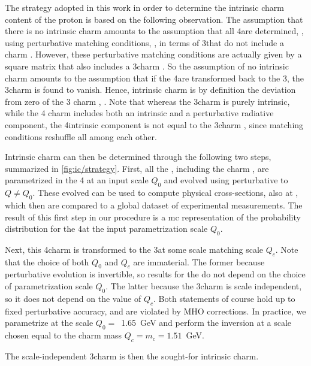 
The strategy adopted in this work in order to determine the intrinsic charm
content of the proton is  based on the following observation.
%
The assumption that there is no intrinsic charm amounts to the assumption that
all 4\fns \pdfs are determined, \cite{Collins:1986mp}, using perturbative
matching conditions, \cite{pdfnnlo}, in terms of  3\fns \pdfs that do not
include a charm \pdf.
%
However, these perturbative matching conditions are actually given by a square
matrix that also includes a 3\fns charm \pdf.
%
So the assumption of no intrinsic charm amounts to the assumption
that if the 4\fns \pdfs are transformed back to the 3\fns, the 3\fns charm
\pdf is found to vanish.
Hence, intrinsic charm is by definition the deviation from zero of the 3\fns
charm \pdf, \cite{Ball:2015dpa}. 
Note that whereas the 3\fns charm \pdf is purely intrinsic, while the 4\fns
charm \pdf includes both an intrinsic and a perturbative radiative component,
the 4\fns intrinsic component is not equal to the 3\fns charm \pdf, since
matching conditions reshuffle all \pdfs among each other. 

Intrinsic charm can then be determined through the following two steps,
summarized in \cref{fig:ic/strategy}.  
First, all the \pdfs, including the charm \pdf, are parametrized  in the 4\fns
at an input scale $Q_0$ and evolved  using \nnlo perturbative \qcd to   $Q \not
= Q_0$.
%
These evolved \pdfs can be used to  compute physical cross-sections, also at
\nnlo, which then are compared to a global dataset of experimental
measurements.
%
The result of this first step in our procedure is  a \acrfull{mc}
representation of the probability distribution for the 4\fns \pdfs at the input
parametrization scale $Q_0$.

Next, this 4\fns charm \pdf is transformed to the 3\fns at some scale matching
scale $Q_c$.
%
Note that the choice of both $Q_0$ and $Q_c$ are immaterial. The former because
perturbative evolution is invertible, so results for the \pdfs do not depend on
the choice of parametrization scale $Q_0$.
The latter because  the 3\fns charm is scale independent, so it does not depend
on the value of $Q_c$.
Both statements of course hold up to fixed perturbative accuracy, and are
violated by MHO corrections.
%
In practice, we parametrize \pdfs at the scale $Q_0=$~1.65~GeV and perform the
inversion at a scale chosen equal to the charm mass $Q_c=m_c=1.51$~GeV.

The scale-independent 3\fns charm \pdf is then the sought-for intrinsic charm.

